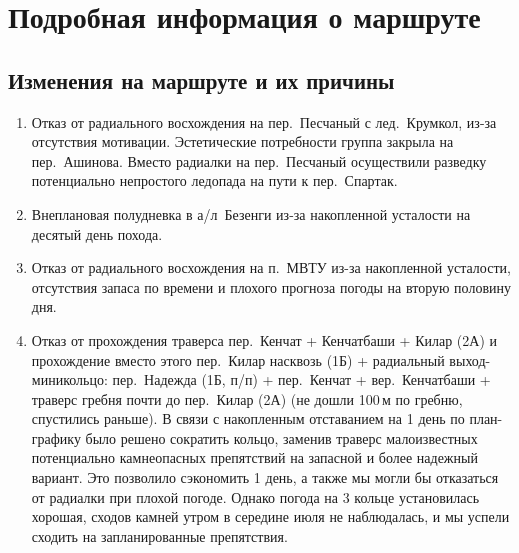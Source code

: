 \section{Подробная информация о маршруте}\label{sec:route}
	\subsection{Изменения на маршруте и их причины}\label{subsec:changes_of_way}
		\begin{enumerate}
			\item Отказ от радиального восхождения на пер.~Песчаный с лед.~Крумкол, из-за отсутствия мотивации.
			Эстетические потребности группа закрыла на пер.~Ашинова. Вместо радиалки на пер.~Песчаный осуществили разведку потенциально непростого ледопада на пути к пер.~Спартак.
			\item Внеплановая полудневка в а/л~Безенги из-за накопленной усталости на десятый день похода.
			\item Отказ от радиального восхождения на п.~МВТУ из-за накопленной усталости, отсутствия запаса по
			времени и плохого прогноза погоды на вторую половину дня.
			\item Отказ от прохождения траверса пер.~Кенчат + Кенчатбаши + Килар (2А) и прохождение вместо этого пер.~Килар
			насквозь (1Б) + радиальный выход-миникольцо: пер.~Надежда (1Б, п/п) + пер.~Кенчат + вер.~Кенчатбаши +
			траверс гребня почти до пер.~Килар (2А) (не дошли 100\,м по гребню, спустились раньше). В связи с накопленным
			отставанием на 1 день по план-графику было решено сократить кольцо, заменив траверс малоизвестных потенциально камнеопасных препятствий
			на запасной и более надежный вариант. Это позволило сэкономить 1 день, а также мы могли бы отказаться от радиалки при плохой
			погоде. Однако погода на 3 кольце установилась хорошая, сходов камней утром в середине июля не наблюдалась, и мы успели сходить на запланированные препятствия.
		\end{enumerate}
	
	
